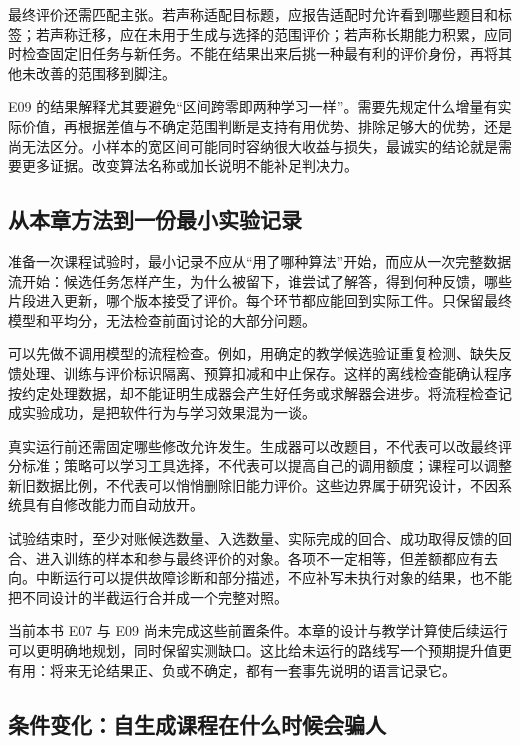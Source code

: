 最终评价还需匹配主张。若声称适配目标题，应报告适配时允许看到哪些题目和标签；若声称迁移，应在未用于生成与选择的范围评价；若声称长期能力积累，应同时检查固定旧任务与新任务。不能在结果出来后挑一种最有利的评价身份，再将其他未改善的范围移到脚注。

E09 的结果解释尤其要避免“区间跨零即两种学习一样”。需要先规定什么增量有实际价值，再根据差值与不确定范围判断是支持有用优势、排除足够大的优势，还是尚无法区分。小样本的宽区间可能同时容纳很大收益与损失，最诚实的结论就是需要更多证据。改变算法名称或加长说明不能补足判决力。

\subsection{从本章方法到一份最小实验记录}
\label{sec:ch11-minrecord}

准备一次课程试验时，最小记录不应从“用了哪种算法”开始，而应从一次完整数据流开始：候选任务怎样产生，为什么被留下，谁尝试了解答，得到何种反馈，哪些片段进入更新，哪个版本接受了评价。每个环节都应能回到实际工件。只保留最终模型和平均分，无法检查前面讨论的大部分问题。

可以先做不调用模型的流程检查。例如，用确定的教学候选验证重复检测、缺失反馈处理、训练与评价标识隔离、预算扣减和中止保存。这样的离线检查能确认程序按约定处理数据，却不能证明生成器会产生好任务或求解器会进步。将流程检查记成实验成功，是把软件行为与学习效果混为一谈。

真实运行前还需固定哪些修改允许发生。生成器可以改题目，不代表可以改最终评分标准；策略可以学习工具选择，不代表可以提高自己的调用额度；课程可以调整新旧数据比例，不代表可以悄悄删除旧能力评价。这些边界属于研究设计，不因系统具有自修改能力而自动放开。

试验结束时，至少对账候选数量、入选数量、实际完成的回合、成功取得反馈的回合、进入训练的样本和参与最终评价的对象。各项不一定相等，但差额都应有去向。中断运行可以提供故障诊断和部分描述，不应补写未执行对象的结果，也不能把不同设计的半截运行合并成一个完整对照。

当前本书 E07 与 E09 尚未完成这些前置条件。本章的设计与教学计算使后续运行可以更明确地规划，同时保留实测缺口。这比给未运行的路线写一个预期提升值更有用：将来无论结果正、负或不确定，都有一套事先说明的语言记录它。


\subsection{条件变化：自生成课程在什么时候会骗人}
\label{sec:ch11-conditions}

